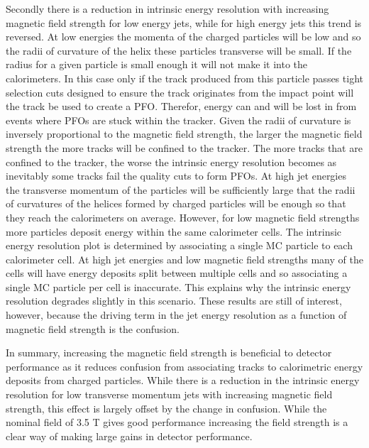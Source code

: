 Secondly there is a reduction in intrinsic energy resolution with increasing magnetic field strength for low energy jets, while for high energy jets this trend is reversed.  At low energies the momenta of the charged particles will be low and so the radii of curvature of the helix these particles transverse will be small.  If the radius for a given particle is small enough it will not make it into the calorimeters.  In this case only if the track produced from this particle passes tight selection cuts designed to ensure the track originates from the impact point will the track be used to create a PFO.  Therefor, energy can and will be lost in from events where PFOs are stuck within the tracker.  Given the radii of curvature is inversely proportional to the magnetic field strength, the larger the magnetic field strength the more tracks will be confined to the tracker.  The more tracks that are confined to the tracker, the worse the intrinsic energy resolution becomes as inevitably some tracks fail the quality cuts to form PFOs.  At high jet energies the transverse momentum of the particles will be sufficiently large that the radii of curvatures of the helices formed by charged particles will be enough so that they reach the calorimeters on average.  However, for low magnetic field strengths more particles deposit energy within the same calorimeter cells.  The intrinsic energy resolution plot is determined by associating a single MC particle to each calorimeter cell.  At high jet energies and low magnetic field strengths many of the cells will have energy deposits split between multiple cells and so associating a single MC particle per cell is inaccurate.  This explains why the intrinsic energy resolution degrades slightly in this scenario.  These results are still of interest, however, because the driving term in the jet energy resolution as a function of magnetic field strength is the confusion.

In summary, increasing the magnetic field strength is beneficial to detector performance as it reduces confusion from associating tracks to calorimetric energy deposits from charged particles.  While there is a reduction in the intrinsic energy resolution for low transverse momentum jets with increasing magnetic field strength, this effect is largely offset by the change in confusion.  While the nominal field of 3.5 T gives good performance increasing the field strength is a clear way of making large gains in detector performance.


